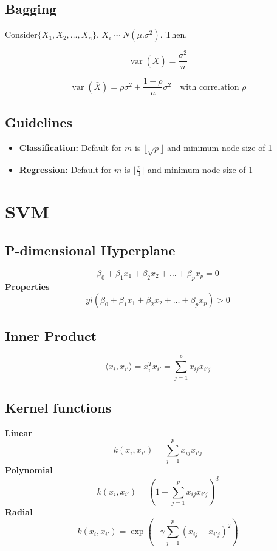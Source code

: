 \documentclass[a4paper,9pt,fleqn]{extarticle}
\DeclareMathOperator{\var}{var}
\begin{document}
\subsection*{Bagging}
Consider\(\{X_1, X_2, \dots, X_n\} \), \(X_i \sim N(\mu. \sigma^2)\).
Then,

\begin{minipage}[t]{0.45\textwidth}
    \vspace{-2em}
    \[
    \var(\bar{X}) = \frac{\sigma^2}{n}
    \]
\end{minipage}
\hspace{-0.1\textwidth}
\begin{minipage}[t]{0.45\textwidth}
    \vspace{-2em}
    \[  
    \var(\bar{X}) = \rho\sigma^2 + \frac{1 - \rho}{n}\sigma^2 \quad \text{with correlation } \rho 
    \]
\end{minipage}

\subsection*{Guidelines}
\begin{itemize}
    \item \textbf{Classification:} Default for $m$ is $\lfloor \sqrt{p} \rfloor$ and minimum node size of 1
    \item \textbf{Regression:} Default for $m$ is $\lfloor \frac{p}{3} \rfloor$ and minimum node size of 1
\end{itemize}

\section*{SVM}
\begin{minipage}[t]{0.45\textwidth}
\subsection*{P-dimensional Hyperplane}
\[
\beta_0 + \beta_1x_1 + \beta_2x_2 + \ldots + \beta_px_p = 0
\]
\textbf{Properties}
\[
yi(\beta_0 + \beta_1x_1 + \beta_2x_2 + \ldots + \beta_px_p) > 0
\]
\subsection*{Inner Product}
\[
\langle x_i, x_{i'} \rangle = x_i^T x_{i'} = \sum_{j=1}^{p} x_{ij} x_{i'j}
\]
\end{minipage}
\hfill
\begin{minipage}[t]{0.45\textwidth}
    \subsection*{Kernel functions}
    \textbf{Linear} 
    \[
    k(x_i, x_{i'}) = \sum_{j=1}^{p}x_{ij}x_{i'j}
    \]
    \textbf{Polynomial}
    \[
    k(x_i, x_{i'}) = \left(1 + \sum_{j=1}^{p}x_{ij}x_{i'j} \right)^d 
    \]
    \textbf{Radial} 
    \[
    k(x_i, x_{i'}) = \exp\left( -\gamma\sum_{j=1}^{p}(x_{ij} - x_{i'j})^2 \right)
    \]
\end{minipage}
\clearpage
\end{document}
